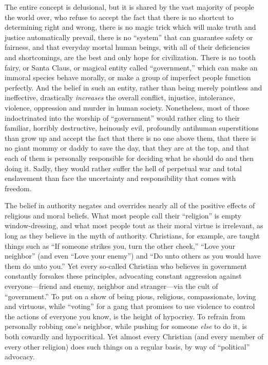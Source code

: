 \documentclass{book}
\begin{document}
The entire concept is delusional, but it is shared by the vast majority of people the world over, who refuse to accept the fact that there is no shortcut to determining right and wrong, there is no magic trick which will make truth and justice automatically prevail, there is no \enquote{system} that can guarantee safety or fairness, and that everyday mortal human beings, with all of their deficiencies and shortcomings, are the best and only hope for civilization. There is no tooth fairy, or Santa Claus, or magical entity called \enquote{government,} which can make an immoral species behave morally, or make a group of imperfect people function perfectly. And the belief in such an entity, rather than being merely pointless and ineffective, drastically \emph{increases} the overall conflict, injustice, intolerance, violence, oppression and murder in human society. Nonetheless, most of those indoctrinated into the worship of \enquote{government} would rather cling to their familiar, horribly destructive, heinously evil, profoundly antihuman superstitions than grow up and accept the fact that there is no one above them, that there is no giant mommy or daddy to save the day, that they are at the top, and that each of them is personally responsible for deciding what he should do and then doing it. Sadly, they would rather suffer the hell of perpetual war and total enslavement than face the uncertainty and responsibility that comes with freedom.

The belief in authority negates and overrides nearly all of the positive effects of religious and moral beliefs. What most people call their \enquote{religion} is empty window-dressing, and what most people tout as their moral virtue is irrelevant, as long as they believe in the myth of authority. Christians, for example, are taught things such as \enquote{If someone strikes you, turn the other cheek,} \enquote{Love your neighbor} (and even \enquote{Love your enemy}) and \enquote{Do unto others as you would have them do unto you.} Yet every so-called Christian who believes in government constantly forsakes these principles, advocating constant aggression against everyone---friend and enemy, neighbor and stranger---via the cult of \enquote{government.} To put on a show of being pious, religious, compassionate, loving and virtuous, while \enquote{voting} for a gang that promises to use violence to control the actions of everyone you know, is the height of hypocrisy. To refrain from personally robbing one's neighbor, while pushing for someone \emph{else} to do it, is both cowardly and hypocritical. Yet almost every Christian (and every member of every other religion) does such things on a regular basis, by way of \enquote{political} advocacy.
\end{document}
